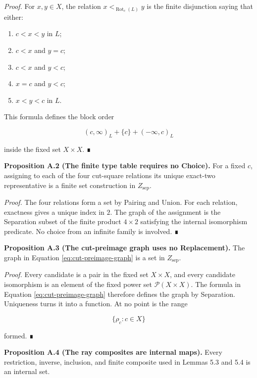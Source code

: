\documentclass[
  english,
  11pt,
  reqno]{amsart}
\providecommand{\tightlist}{%
  \setlength{\itemsep}{0pt}\setlength{\parskip}{0pt}}
\begin{document}
\emph{Proof.} For \(x,y\in X\), the relation
\(x<_{\operatorname{Rot}_c(L)}y\) is the finite disjunction saying that
either:

\begin{enumerate}
\tightlist
\item
  \(c<x<y\) in \(L\);
\item
  \(c<x\) and \(y=c\);
\item
  \(c<x\) and \(y<c\);
\item
  \(x=c\) and \(y<c\);
\item
  \(x<y<c\) in \(L\).
\end{enumerate}

This formula defines the block order

\[
(c,\infty)_L+\{c\}+(-\infty,c)_L
\]

inside the fixed set \(X\times X\). ∎

\protect{}\label{prop:a-2-cut-table}

\textbf{Proposition A.2 (The finite type table requires no Choice).} For
a fixed \(c\), assigning to each of the four cut-square relations its
unique exact-two representative is a finite set construction in
\(Z_{\mathrm{sep}}\).

\emph{Proof.} The four relations form a set by Pairing and Union. For
each relation, exactness gives a unique index in \(2\). The graph of the
assignment is the Separation subset of the finite product \(4\times2\)
satisfying the internal isomorphism predicate. No choice from an
infinite family is involved. ∎

\protect{}\label{prop:a-3-delta-graph}

\textbf{Proposition A.3 (The cut-preimage graph uses no Replacement).}
The graph in Equation
\hyperref[eq:cut-preimage-graph]{\eqref{eq:cut-preimage-graph}} is a set
in \(Z_{\mathrm{sep}}\).

\emph{Proof.} Every candidate is a pair in the fixed set \(X\times X\),
and every candidate isomorphism is an element of the fixed power set
\(\mathcal P(X\times X)\). The formula in Equation
\hyperref[eq:cut-preimage-graph]{\eqref{eq:cut-preimage-graph}}
therefore defines the graph by Separation. Uniqueness turns it into a
function. At no point is the range

\[
\{\rho_c:c\in X\}
\]

formed. ∎

\protect{}\label{prop:a-4-composites}

\textbf{Proposition A.4 (The ray composites are internal maps).} Every
restriction, inverse, inclusion, and finite composite used in Lemmas 5.3
and 5.4 is an internal set.
\end{document}
